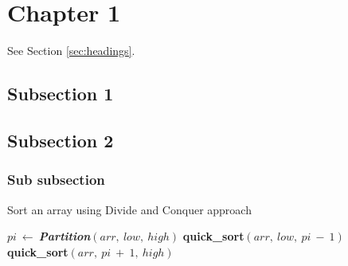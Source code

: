\section{Chapter 1}

\lipsum[4]

\label{sec:headings}

\lipsum[7] See Section \ref{sec:headings}.

\subsection{Subsection 1}

\lipsum[5]

\subsection{Subsection 2}

\subsubsection{Sub subsection}

\lipsum[6]

\begin{algorithm}
	\caption{Sort an array using Divide and Conquer approach}
	\begin{algorithmic}[1]
				\State $pi\ \gets\ $\textbf{\textit{Partition}}$(arr,\ low,\ high)$
				\State \textbf{quick\_sort}$(arr,\ low,\ pi\ -\ 1)$
				\State \textbf{quick\_sort}$(arr,\ pi\ +\ 1,\ high)$
			\EndIf
		\EndFunction
	\end{algorithmic}
\end{algorithm}

